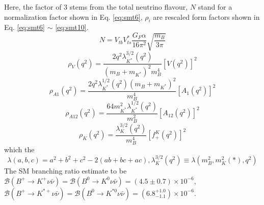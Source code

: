 Here, the factor of 3 stems from the total neutrino flavour, $N$ stand for a normalization factor shown in Eq. \ref{eq:smt6}, $\rho_i$ are  rescaled form factors shown in Eq. \ref{eq:smt6} $\sim$ \ref{eq:smt10}.
\begin{equation}
\label{eq:smt6}
N = V_{tb}V_{ts}^*\frac{G_F \alpha}{16 \pi ^2} \sqrt{\frac{m_B}{3 \pi}}
\end{equation}
\begin{equation}
\label{eq:smt7}
\rho_V(q^2) = \frac{2q^2 \lambda^{3/2}_{K^*}(q^2)}{(m_B + m_{K^*})^2 m_B^4}[V(q^2)]^2
\end{equation}
\begin{equation}
\label{eq:smt8}
\rho_{A1}(q^2) = \frac{2q^2 \lambda^{1/2}_{K^*}(q^2)(m_B + m_{K^*})^2}{ m_B^4}[A_1(q^2)]^2
\end{equation}
\begin{equation}
\label{eq:smt9}
\rho_{A12}(q^2) = \frac{64m^2_{K^*}\lambda^{1/2}_{K^*}(q^2)}{m_B^2}[A_{12}(q^2)]^2
\end{equation}
\begin{equation}
\label{eq:smt10}
\rho_K(q^2) = \frac{\lambda^{3/2}_{K}(q^2)}{m_B^4}[f^K_+(q^2)]^2
\end{equation}
which the 
\begin{equation}
\label{eq:smt11}
\lambda (a,b,c) = a^2+b^2+c^2-2(ab+bc+ac), \lambda^{3/2}_{K}(q^2) \equiv \lambda(m^2_B, m^2_K{(*)}, q^2)
\end{equation}
The SM branching ratio estimate to be $\mathcal{B}(B^+ \rightarrow K^{+} \nu \bar{\nu})=\mathcal{B}(B^0 \rightarrow K^{0} \nu \bar{\nu}) = (4.5 \pm 0.7) \times 10^{-6}$, $\mathcal{B}(B^+ \rightarrow K^{*+} \nu \bar{\nu})=\mathcal{B}(B^0 \rightarrow K^{*0} \nu \bar{\nu}) = (6.8 ^{+1.0}_{-1.1}) \times 10^{-6}$.\\

